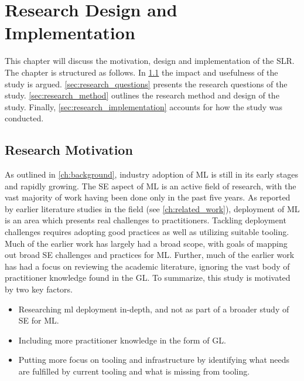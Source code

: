 \chapter{Research Design and Implementation}
\label{ch:research_design_and_implementation}
This chapter will discuss the motivation, design and implementation of the SLR.
The chapter is structured as follows.
In \cref{sec:research_motivation} the impact and usefulness of the study is argued.
\cref{sec:research_questions} presents the research questions of the study.
\cref{sec:research_method} outlines the research method and design of the study.
Finally, \cref{sec:research_implementation} accounts for how the study was conducted.

\section{Research Motivation}
\label{sec:research_motivation}
As outlined in \cref{ch:background}, industry adoption of ML is still in its early stages and rapidly growing.
The SE aspect of ML is an active field of research, with the vast majority of work having been done only in the past five years.
As reported by earlier literature studies in the field (see \cref{ch:related_work}), deployment of ML is an area which presents real challenges to practitioners.
Tackling deployment challenges requires adopting good practices as well as utilizing suitable tooling.
Much of the earlier work has largely had a broad scope, with goals of mapping out broad SE challenges and practices for ML.
Further, much of the earlier work has had a focus on reviewing the academic literature, ignoring the vast body of practitioner knowledge found in the GL.
To summarize, this study is motivated by two key factors.
\begin{itemize}
    \item Researching \acrshort{ml} deployment in-depth, and not as part of a broader study of SE for ML.
    \item Including more practitioner knowledge in the form of GL.
    \item Putting more focus on tooling and infrastructure by identifying what needs are fulfilled by current tooling and what is missing from tooling.
\end{itemize}

